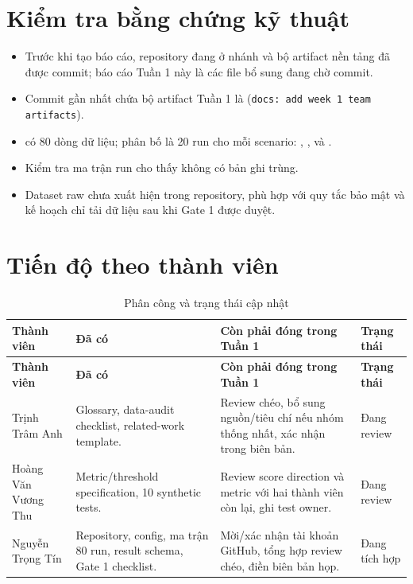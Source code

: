 \documentclass[12pt,a4paper,oneside]{article}
\begin{document}
\section{Kiểm tra bằng chứng kỹ thuật}

\begin{itemize}[leftmargin=1.05cm,itemsep=0.25em]
  \item Trước khi tạo báo cáo, repository đang ở nhánh  và bộ artifact nền tảng đã được commit; báo cáo Tuần 1 này là các file bổ sung đang chờ commit.
  \item Commit gần nhất chứa bộ artifact Tuần 1 là  (\texttt{docs: add week 1 team artifacts}).
  \item {} có 80 dòng dữ liệu; phân bố là 20 run cho mỗi scenario: , ,  và .
  \item Kiểm tra ma trận run cho thấy không có bản ghi  trùng.
  \item Dataset raw chưa xuất hiện trong repository, phù hợp với quy tắc bảo mật và kế hoạch chỉ tải dữ liệu sau khi Gate 1 được duyệt.
\end{itemize}

\section{Tiến độ theo thành viên}

\small
\renewcommand{\arraystretch}{1.3}
\noindent\begin{longtable}{L{3.0cm}L{4.5cm}L{5.2cm}C{1.5cm}}
\caption{Phân công và trạng thái cập nhật}\label{tab:members}\\
\toprule
\textbf{Thành viên} & \textbf{Đã có} & \textbf{Còn phải đóng trong Tuần 1} & \textbf{Trạng thái}\\
\midrule
\endfirsthead
\toprule
\textbf{Thành viên} & \textbf{Đã có} & \textbf{Còn phải đóng trong Tuần 1} & \textbf{Trạng thái}\\
\midrule
\endhead
\bottomrule
\endfoot
Trịnh Trâm Anh & Glossary, data-audit checklist, related-work template. & Review chéo, bổ sung nguồn/tiêu chí nếu nhóm thống nhất, xác nhận trong biên bản. & Đang review\\
Hoàng Văn Vương Thu & Metric/threshold specification, 10 synthetic tests. & Review score direction và metric với hai thành viên còn lại, ghi test owner. & Đang review\\
Nguyễn Trọng Tín & Repository, config, ma trận 80 run, result schema, Gate 1 checklist. & Mời/xác nhận tài khoản GitHub, tổng hợp review chéo, điền biên bản họp. & Đang tích hợp\\
\end{longtable}
\normalsize
\end{document}
